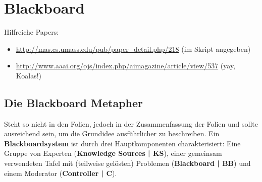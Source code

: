\documentclass{article} %
\begin{document}
	\section{Blackboard}
	Hilfreiche Papers: 
	\begin{itemize}
		\item \url{http://mas.cs.umass.edu/pub/paper_detail.php/218} (im Skript angegeben)
		\item \url{http://www.aaai.org/ojs/index.php/aimagazine/article/view/537} (yay, Koalas!)
	\end{itemize}
	\subsection{Die Blackboard Metapher}
	Steht so nicht in den Folien, jedoch in der Zusammenfassung der Folien und sollte ausreichend sein, um die Grundidee ausführlicher zu beschreiben.
	Ein \textbf{Blackboardsystem} ist durch drei Hauptkomponenten charakterisiert:
	Eine Gruppe von Experten (\textbf{Knowledge Sources | KS}), einer gemeinsam verwendeten Tafel mit (teilweise gelösten) Problemen (\textbf{Blackboard | BB}) und einem Moderator (\textbf{Controller | C}).
	 
\end{document}
